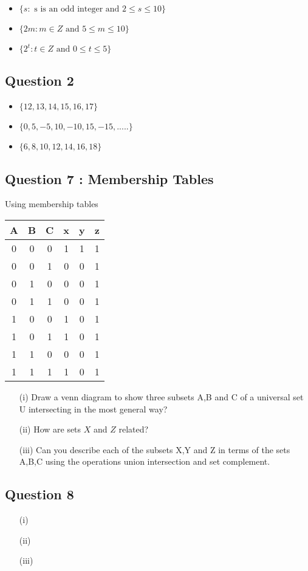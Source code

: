\documentclass[a4paper,12pt]{article}
\begin{document}
\begin{itemize}
	\item $\{ s :  \mbox{ s is an odd integer and } 2 \leq s \leq 10 \}$
	\item $\{ 2m :  m \in Z \mbox{ and }5 \leq m \leq 10 \}$
	\item $\{ 2^t :  t \in Z \mbox{ and } 0 \leq t \leq 5 \}$
\end{itemize}

\subsection*{Question 2}

\begin{itemize}
	\item $\{12,13,14,15,16,17\}$
	\item $\{0,5,-5,10,-10,15,-15,.....\}$
	\item $\{6,8,10,12,14,16,18\}$
\end{itemize}

\subsection*{Question 7 : Membership Tables}
Using membership tables
\begin{tabular}{|ccc|c|c|c|}
	\hline
	A & B & C & x & y & z \\\hline
	0 & 0 & 0 & 1 & 1 & 1 \\
	0 & 0 & 1 & 0 & 0 & 1 \\
	0 & 1 & 0 & 0 & 0 & 1 \\
	0 & 1 & 1 & 0 & 0 & 1 \\
	1 & 0 & 0 & 1 & 0 & 1 \\
	1 & 0 & 1 & 1 & 0 & 1 \\
	1 & 1 & 0 & 0 & 0 & 1 \\
	1 & 1 & 1 & 1 & 0 & 1 \\
	\hline
\end{tabular}
\begin{itemize}
	\item[(i)] Draw a venn diagram to show three subsets A,B and C of a universal set U intersecting in
	the most general way?
	\item[(ii)] How are sets $X$ and $Z$ related?
	\item[(iii)] Can you describe each of the subsets X,Y and Z in terms  of the
	sets A,B,C using the operations union intersection and set complement.
\end{itemize}
\subsection*{Question 8}
\begin{itemize}
	
	\item[(i)] 
	
	\item[(ii)]
	
	\item[(iii)]
	
\end{itemize}
\end{document}
